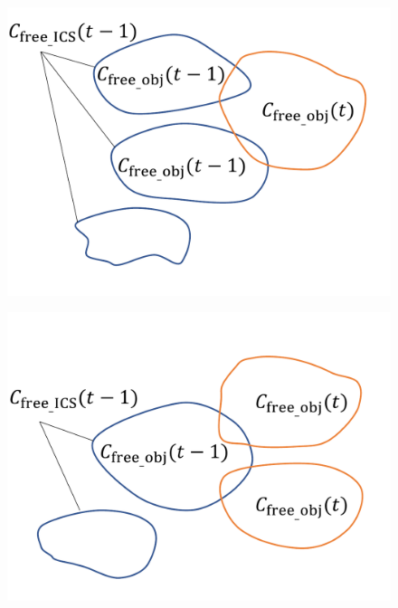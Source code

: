 \documentclass[a4paper,twoside,12pt,papersize, dvipdfmx]{iirthesis}
\begin{document}
\begin{figure}[b]
\begin{minipage}{0.33\hsize}
\includegraphics[width=\hsize]{fig/3-new-planner/rev_cagingmani_ver1.pdf}
\subcaption{}\label{fig::planner::cm1}
\end{minipage}\hfill
\begin{minipage}{0.33\hsize}
\includegraphics[width=\hsize]{fig/3-new-planner/rev_cagingmani_ver2.pdf}
\subcaption{}\label{fig::planner::cm2}
\end{minipage}\hfill
\begin{minipage}{0.33\hsize}

\end{minipage}
\end{figure}
\end{document}
